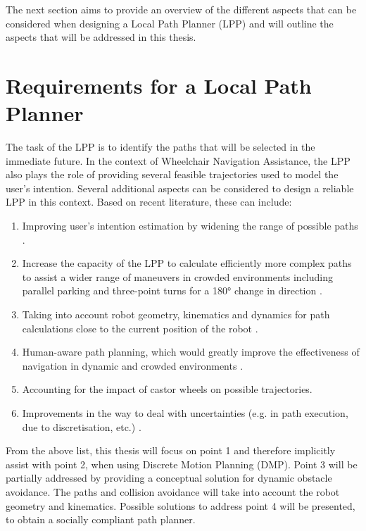 The next section aims to provide an overview of the different aspects that can be considered when designing a Local Path Planner (LPP) and will outline the aspects that will be addressed in this thesis.

\newpage

\section{Requirements for a Local Path Planner} \label{sec:ReqLPP}
The task of the LPP is to identify the paths that will be selected in the immediate future. In the context of Wheelchair Navigation Assistance, the LPP also plays the role of providing several feasible trajectories used to model the user's intention. Several additional aspects can be considered to design a reliable LPP in this context. Based on recent literature, these can include: 
\vspace{1em}
\begin{enumerate}
\item Improving user’s intention estimation by widening the range of possible paths \cite{DemeesterEtAl2012,VanderPoortenEtAl2012}.
\item Increase the capacity of the LPP to calculate efficiently more complex paths to assist a wider range of maneuvers in crowded environments including parallel parking and three-point turns for a 180° change in direction \cite{DemeesterEtAl2012,PivtoraikoEtAl2009,ZipsEtAl2016}.
\item Taking into account robot geometry, kinematics and dynamics for path calculations close to the current position of the robot \cite{BouraineEtAl2011,DemeesterEtAl2012,PivtoraikoEtAl2009}.
\item Human-aware path planning, which would greatly improve the effectiveness of navigation in dynamic and crowded environments \cite{KruseEtAl2013,TrautmanEtAl2015}.
\item Accounting for the impact of castor wheels on possible trajectories.
\item Improvements in the way to deal with uncertainties (e.g. in path execution, due to discretisation, etc.) \cite{BouraineEtAl2011,MercyEtAl2016}.
\end{enumerate}
\vspace{1em}

From the above list, this thesis will focus on point 1 and therefore implicitly assist with point 2, when using Discrete Motion Planning (DMP). Point 3 will be partially addressed by providing a conceptual solution for dynamic obstacle avoidance. The paths and collision avoidance will take into account the robot geometry and kinematics. Possible solutions to address point 4 will be presented, to obtain a socially compliant path planner.

